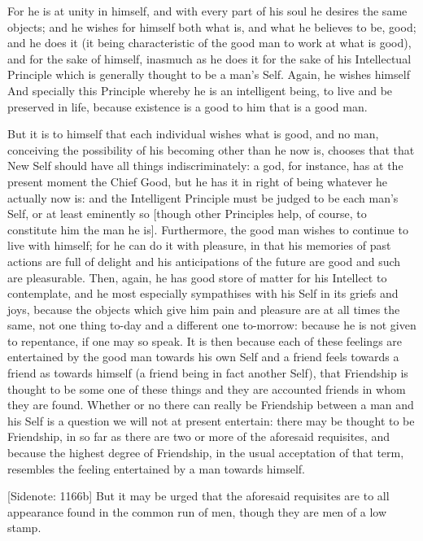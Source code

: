 For he is at unity in himself, and with every part of his soul he
desires the same objects; and he wishes for himself both what is, and
what he believes to be, good; and he does it (it being characteristic
of the good man to work at what is good), and for the sake of himself,
inasmuch as he does it for the sake of his Intellectual Principle which
is generally thought to be a man's Self. Again, he wishes himself And
specially this Principle whereby he is an intelligent being, to live and
be preserved in life, because existence is a good to him that is a good
man.

But it is to himself that each individual wishes what is good, and no
man, conceiving the possibility of his becoming other than he now is,
chooses that that New Self should have all things indiscriminately: a
god, for instance, has at the present moment the Chief Good, but he has
it in right of being whatever he actually now is: and the Intelligent
Principle must be judged to be each man's Self, or at least eminently so
[though other Principles help, of course, to constitute him the man he
is]. Furthermore, the good man wishes to continue to live with himself;
for he can do it with pleasure, in that his memories of past actions are
full of delight and his anticipations of the future are good and such
are pleasurable. Then, again, he has good store of matter for his
Intellect to contemplate, and he most especially sympathises with his
Self in its griefs and joys, because the objects which give him pain and
pleasure are at all times the same, not one thing to-day and a different
one to-morrow: because he is not given to repentance, if one may so
speak. It is then because each of these feelings are entertained by the
good man towards his own Self and a friend feels towards a friend as
towards himself (a friend being in fact another Self), that Friendship
is thought to be some one of these things and they are accounted friends
in whom they are found. Whether or no there can really be Friendship
between a man and his Self is a question we will not at present
entertain: there may be thought to be Friendship, in so far as there are
two or more of the aforesaid requisites, and because the highest degree
of Friendship, in the usual acceptation of that term, resembles the
feeling entertained by a man towards himself.

[Sidenote: 1166b] But it may be urged that the aforesaid requisites are
to all appearance found in the common run of men, though they are men of
a low stamp.

